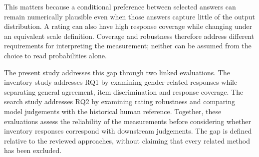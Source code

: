 This matters because a conditional preference between selected answers can
remain numerically plausible even when those answers capture little of the
output distribution. A rating can also have high response coverage while
changing under an equivalent scale definition. Coverage and robustness
therefore address different requirements for interpreting the measurement;
neither can be assumed from the choice to read probabilities alone.

The present study addresses this gap through two linked evaluations.
The inventory study addresses RQ1 by examining gender-related responses
while separating general agreement, item discrimination and response coverage.
The search study addresses RQ2 by examining rating robustness and comparing
model judgements with the historical human reference. Together, these evaluations assess the reliability
of the measurements before considering whether inventory responses correspond
with downstream judgements. The gap is defined relative to the reviewed
approaches, without claiming that every related method has been excluded.

